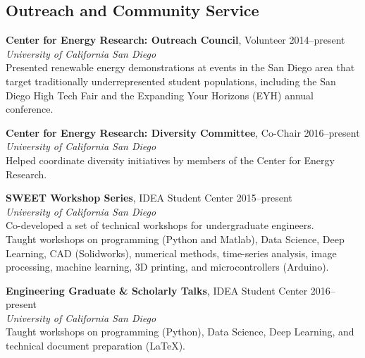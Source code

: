 \documentclass[]{res}
\begin{document}
\begin{resume}
\section{Outreach and Community Service}
\vspace{0.1in}
%

\textbf{Center for Energy Research: Outreach Council}, Volunteer \hfill 2014--present \\
\textit{University of California San Diego} \\
Presented renewable energy demonstrations at events in the San Diego area that
target traditionally underrepresented student populations, including the San Diego
High Tech Fair and the Expanding Your Horizons (EYH) annual conference.

\textbf{Center for Energy Research: Diversity Committee}, Co-Chair \hfill 2016--present \\
\textit{University of California San Diego} \\
Helped coordinate diversity initiatives by members of the Center for Energy Research.

\textbf{SWEET Workshop Series}, IDEA Student Center \hfill 2015--present \\
\textit{University of California San Diego} \\
Co-developed a set of technical workshops for undergraduate engineers. \\
Taught workshops on programming (Python and Matlab), Data Science, Deep
Learning, CAD (Solidworks), numerical methods, time-series analysis, image
processing, machine learning, 3D printing, and microcontrollers (Arduino).

\textbf{Engineering Graduate \& Scholarly Talks}, IDEA Student Center \hfill 2016--present \\
\textit{University of California San Diego} \\
Taught workshops on programming (Python), Data Science, Deep Learning, and
technical document preparation (LaTeX).


\end{resume}
\end{document}
